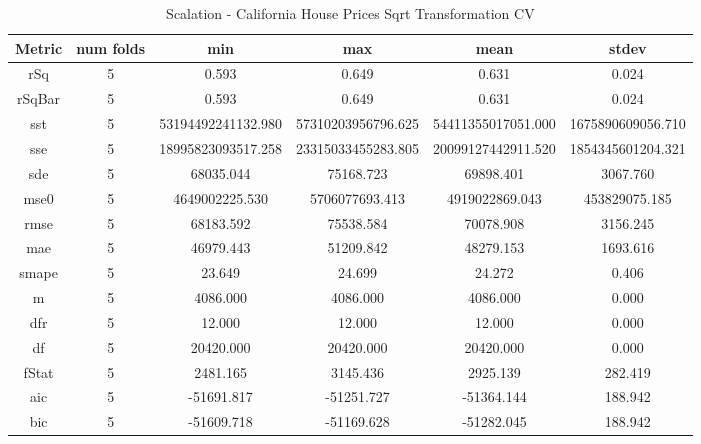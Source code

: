 \documentclass{article}
\begin{document}
\begin{table}[H]
\centering
\caption{Scalation - California House Prices Sqrt Transformation CV}
\label{tab:Scalation - House Prices Sqrt Transformation CV}
\begin{tabular}{|c|c|c|c|c|c|}\hline
Metric & num folds & min & max & mean & stdev \\ \hline \hline
rSq & 5 & 0.593 & 0.649 & 0.631 & 0.024 \\ \hline
rSqBar & 5 & 0.593 & 0.649 & 0.631 & 0.024 \\ \hline
sst & 5 & 53194492241132.980 & 57310203956796.625 & 54411355017051.000 & 1675890609056.710 \\ \hline
sse & 5 & 18995823093517.258 & 23315033455283.805 & 20099127442911.520 & 1854345601204.321 \\ \hline
sde & 5 & 68035.044 & 75168.723 & 69898.401 & 3067.760 \\ \hline
mse0 & 5 & 4649002225.530 & 5706077693.413 & 4919022869.043 & 453829075.185 \\ \hline
rmse & 5 & 68183.592 & 75538.584 & 70078.908 & 3156.245 \\ \hline
mae & 5 & 46979.443 & 51209.842 & 48279.153 & 1693.616 \\ \hline
smape & 5 & 23.649 & 24.699 & 24.272 & 0.406 \\ \hline
m & 5 & 4086.000 & 4086.000 & 4086.000 & 0.000 \\ \hline
dfr & 5 & 12.000 & 12.000 & 12.000 & 0.000 \\ \hline
df & 5 & 20420.000 & 20420.000 & 20420.000 & 0.000 \\ \hline
fStat & 5 & 2481.165 & 3145.436 & 2925.139 & 282.419 \\ \hline
aic & 5 & -51691.817 & -51251.727 & -51364.144 & 188.942 \\ \hline
bic & 5 & -51609.718 & -51169.628 & -51282.045 & 188.942 \\ \hline
\end{tabular}
\end{table}
\end{document}
